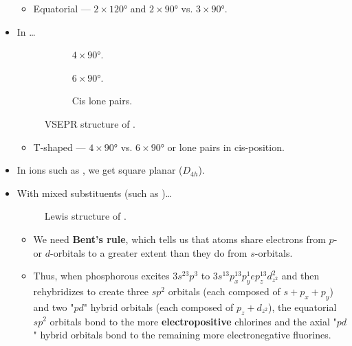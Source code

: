 \documentclass[../main.tex]{subfiles}
\begin{document}
\begin{itemize}
    \begin{itemize}
        \item Equatorial --- $2\times\ang{120}$ and $2\times\ang{90}$ vs. $3\times\ang{90}$.
    \end{itemize}
    \item In \dots
    \begin{figure}[h!]
        \centering
        \begin{subfigure}[b]{0.2\linewidth}
            \centering
            \caption{$4\times\ang{90}$.}
            \label{fig:VSEPR-BrF3a}
        \end{subfigure}
        \begin{subfigure}[b]{0.2\linewidth}
            \centering
            \caption{$6\times\ang{90}$.}
            \label{fig:VSEPR-BrF3b}
        \end{subfigure}
        \begin{subfigure}[b]{0.2\linewidth}
            \centering
            \caption{Cis lone pairs.}
            \label{fig:VSEPR-BrF3c}
        \end{subfigure}
        \caption{VSEPR structure of .}
        \label{fig:VSEPR-BrF3}
    \end{figure}
    \begin{itemize}
        \item T-shaped --- $4\times\ang{90}$ vs. $6\times\ang{90}$ or lone pairs in cis-position.
    \end{itemize}
    \item In ions such as , we get square planar ($D_{4h}$).
    \item With mixed substituents (such as )\dots
    \begin{figure}[h!]
        \centering
        \caption{Lewis structure of .}
        \label{fig:Lewis-PF2Cl3}
    \end{figure}
    \begin{itemize}
        \item We need \textbf{Bent's rule}, which tells us that atoms share electrons from $p$- or $d$-orbitals to a greater extent than they do from $s$-orbitals.
        \item Thus, when phosphorous excites $3s^23p^3$ to $3s^13p_x^13p_y^1ep_z^13d_{z^2}^2$ and then rehybridizes to create three $sp^2$ orbitals (each composed of $s+p_x+p_y$) and two "$pd$" hybrid orbitals (each composed of $p_z+d_{z^2}$), the equatorial $sp^2$ orbitals bond to the more \textbf{electropositive} chlorines and the axial "$pd$" hybrid orbitals bond to the remaining more electronegative fluorines.

\end{itemize}
\end{itemize}
\end{document}
